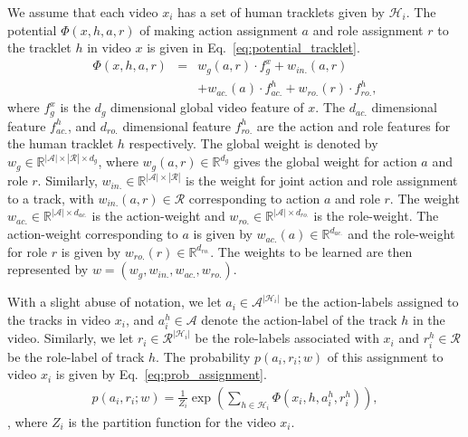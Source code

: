 \documentclass[10pt,twocolumn,letterpaper]{article}
\begin{document}
We assume that each video $x_i$ has a set of human tracklets given by $\mathcal{H}_i$. 
The potential $\Phi(x, h, a, r)$ of making
action assignment $a$ and role assignment $r$ to the tracklet $h$ in video $x$ is given in Eq.~\ref{eq:potential_tracklet}.
\vspace{-4pt}
\begin{eqnarray}\label{eq:potential_tracklet}
  \Phi(x, h, a, r) & = & w_{g}(a,r) \cdot f_{g}^x + w_{in.}(a,r) \\ \nonumber
                   & & + w_{ac.}(a) \cdot f_{ac.}^h + w_{ro.}(r) \cdot f_{ro.}^h, \nonumber
\end{eqnarray} where $f_g^x$ is the $d_g$ dimensional global video feature of $x$. The $d_{ac.}$ dimensional feature
$f_{ac.}^h$, and $d_{ro.}$ dimensional feature $f_{ro.}^h$ are the action and role features 
for the human tracklet $h$ respectively. The global weight is denoted 
by $w_g \in \mathbb{R}^{|\mathcal{A}| \times |\mathcal{R}| \times d_g}$, where $w_g(a,r) \in \mathbb{R}^{d_g}$
gives the global weight for action $a$ and role $r$.
Similarly, $w_{in.} \in \mathbb{R}^{|\mathcal{A}| \times |\mathcal{R}|}$ is the weight for joint 
action and role assignment to a track, with $w_{in.}(a,r) \in \mathcal{R}$ corresponding to action $a$ and role $r$. 
The weight $w_{ac.} \in \mathbb{R}^{|\mathcal{A}| \times d_{ac.}}$
is the action-weight and $w_{ro.} \in \mathbb{R}^{|\mathcal{A}| \times d_{ro.}}$ is the role-weight. The action-weight corresponding
to $a$ is given by $w_{ac.}(a) \in \mathbb{R}^{d_{ac.}}$ and the role-weight for role $r$ is given by $w_{ro.}(r) \in \mathbb{R}^{d_{ro.}}$.
The weights to be learned are then represented by $w = (w_g, w_{in.}, w_{ac.}, w_{ro.})$.

With a slight abuse of notation, we let $a_i \in \mathcal{A}^{|\mathcal{H}_i|}$ be the action-labels assigned to the tracks in video $x_i$, 
and $a_i^h \in \mathcal{A}$ denote the action-label of the track $h$ in the video. 
Similarly, we let $r_i \in \mathcal{R}^{|\mathcal{H}_i|}$ be the role-labels associated with $x_i$ and $r_i^h \in \mathcal{R}$ be the role-label of track $h$.
The probability $p(a_i, r_i; w)$ of this assignment to video $x_i$ is given by Eq.~\ref{eq:prob_assignment}.
\vspace{-4pt}
\begin{eqnarray}\label{eq:prob_assignment}
  p(a_i, r_i; w) = \frac{1}{Z_i} \exp \left(\sum \limits_{h \in \mathcal{H}_i} \Phi(x_i, h, a_i^h, r_i^h) \right),
\end{eqnarray}, where $Z_i$ is the partition function for the video $x_i$.
\end{document}

